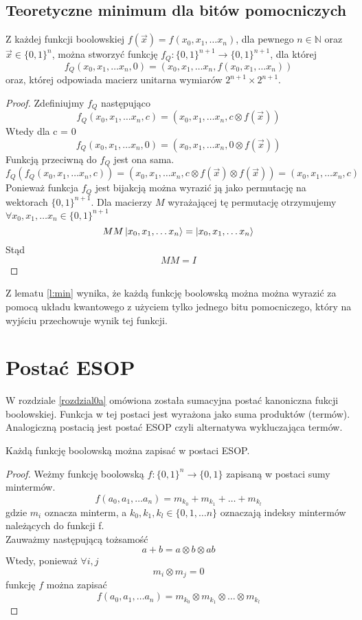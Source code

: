 \subsection{Teoretyczne minimum dla bitów pomocniczych}
\begin{lemma}
    \label{l:min}
    Z każdej funkcji boolowskiej $f(\vec{x}) = f(x_0, x_1, \ldots x_n)$, dla pewnego $n \in \mathbb{N}$ oraz $\vec{x} \in \{0, 1\}^n$, można stworzyć funkcję $f_Q : \{0, 1\}^{n+1}\rightarrow \{0, 1\}^{n+1}$, dla której 
    \[f_Q(x_0, x_1, \ldots x_n, 0) = (x_0, x_1, \ldots x_n, f(x_0, x_1, \ldots x_n))\] 
    oraz, której odpowiada macierz unitarna wymiarów $2^{n+1} \times 2^{n+1}$.
\end{lemma}
\begin{proof}
    Zdefiniujmy $f_Q$ następująco
    \[f_Q(x_0, x_1, \ldots x_n, c) = (x_0, x_1, \ldots x_n, c \otimes f(\vec{x}))\]
    Wtedy dla c = 0
    \[f_Q(x_0, x_1, \ldots x_n, 0) = (x_0, x_1, \ldots x_n, 0 \otimes f(\vec{x}))\]
    Funkcją przeciwną do $f_Q$ jest ona sama.
    \[f_Q(f_Q(x_0, x_1, \ldots x_n, c)) = (x_0, x_1, \ldots x_n, c \otimes f(\vec{x}) \otimes f(\vec{x})) = (x_0, x_1, \ldots x_n, c)\]
    Ponieważ funkcja $f_Q$ jest bijakcją można wyrazić ją jako permutację na wektorach $\{0,1\}^{n+1}$. Dla macierzy $M$ wyrażającej tę permutację otrzymujemy $\forall x_0, x_1, \ldots x_n \in \{0,1\}^{n+1}$
    \[MM\ket{x_0, x_1, \ldots x_n} = \ket{x_0, x_1, \ldots x_n}\]
    Stąd
    \[MM = I\]
\end{proof}
Z lematu \ref{l:min} wynika, że każdą funkcję boolowską można można wyrazić za pomocą układu kwantowego z użyciem tylko jednego bitu pomocniczego, który na wyjściu przechowuje wynik tej funkcji.
\section{Postać ESOP}
W rozdziale \ref{rozdzial0a} omówiona została sumacyjna postać kanoniczna fukcji boolowskiej. Funkcja w tej postaci jest wyrażona jako suma produktów (termów). Analogiczną postacią jest postać ESOP czyli alternatywa wykluczająca termów.
\begin{theorem}
    Każdą funkcję boolowską można zapisać w postaci ESOP.
\end{theorem}
\begin{proof}
    Weżmy funkcję boolowską $f: \{0, 1\}^n \rightarrow \{0, 1\}$ zapisaną w postaci sumy mintermów.
    \[f(a_0, a_1, \ldots a_n) = m_{k_0} + m_{k_1} + \ldots + m_{k_l}\]
    gdzie $m_i$ oznacza minterm, a $k_0, k_1, k_l \in \{0, 1, \ldots n\}$ oznaczają indeksy mintermów należących do funkcji f.\\
    Zauważmy następującą tożsamość
    \[a + b = a \otimes b \otimes ab\]
    Wtedy, ponieważ $\forall i,j$
    \[m_i \otimes m_j = 0\]
    funkcję $f$ można zapisać
    \[f(a_0, a_1, \ldots a_n) = m_{k_0} \otimes m_{k_1} \otimes \ldots \otimes m_{k_l}\]
\end{proof}
